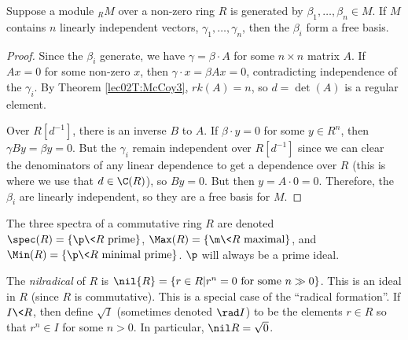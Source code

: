  \begin{corollary}
   Suppose a module ${}_RM$ over a non-zero ring $R$ is generated by $\beta_1,\dots,
   \beta_n\in M$. If $M$ contains $n$ linearly independent vectors, $\gamma_1,\dots,
   \gamma_n$, then the $\beta_i$ form a free basis.
 \end{corollary}
 \begin{proof}
   Since the $\beta_i$ generate, we have $\gamma = \beta\cdot A$ for some $n\times n$
   matrix $A$. If $Ax=0$ for some non-zero $x$, then $\gamma \cdot x = \beta Ax = 0$,
   contradicting independence of the $\gamma_i$. By Theorem \ref{lec02T:McCoy3},
   $rk(A)=n$, so $d=\det(A)$ is a regular element.

   Over $R[d^{-1}]$, there is an inverse $B$ to $A$. If $\beta\cdot
   y=0$ for some $y\in R^n$, then $\gamma By = \beta y=0$. But the $\gamma_i$ remain
   independent over $R[d^{-1}]$ since we can clear the denominators of any linear
   dependence to get a dependence over $R$ (this is where we use that $d\in \C(R)$), so
   $By=0$. But then $y=A\cdot 0 = 0$. Therefore, the $\beta_i$ are linearly independent,
   so they are a free basis for $M$.
%
%
%
 \end{proof}
 \setcounter{lecture}{3}


 The three spectra of a commutative ring $R$ are denoted $\spec(R) = \{\p\< R \text{
 prime}\}$, $\Max(R) = \{\m\< R\text{ maximal}\}$, and $\Min(R) = \{\p\< R \text{ minimal
 prime}\}$. $\p$ will always be a prime ideal.

 The \emph{nilradical} of $R$ is $\nil{R}=\{r\in R| r^n=0 \text{ for some }n\gg 0\}$.
 This is an ideal in $R$ (since $R$ is commutative). This is a special case of the
 ``radical formation''. If $I\< R$, then define $\sqrt{I}$ (sometimes denoted $\rad I$)
 to be the elements $r\in R$ so that $r^n\in I$ for some $n>0$.  In particular, $\nil R =
 \sqrt 0$.

